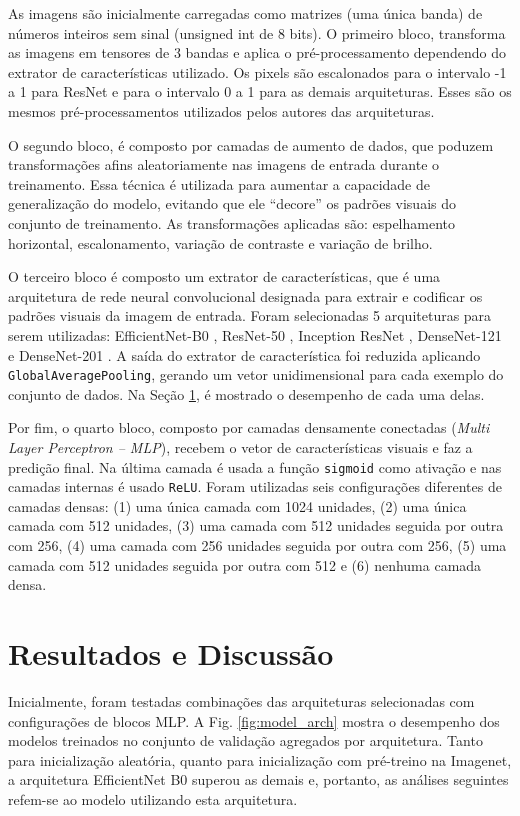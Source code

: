 \documentclass[a4,12pt]{horizon-theme}
\begin{document}
As imagens são inicialmente carregadas como matrizes (uma única banda) de números inteiros sem sinal (unsigned int de 8 bits). O primeiro bloco, transforma as imagens em tensores de 3 bandas e aplica o pré-processamento dependendo do extrator de características utilizado. Os pixels são escalonados para o intervalo -1 a 1 para ResNet e para o intervalo 0 a 1 para as demais arquiteturas. Esses são os mesmos pré-processamentos utilizados pelos autores das arquiteturas.

O segundo bloco, é composto por camadas de aumento de dados, que poduzem transformações afins aleatoriamente nas imagens de entrada durante o treinamento. Essa técnica é utilizada para aumentar a capacidade de generalização do modelo, evitando que ele ``decore'' os padrões visuais do conjunto de treinamento. As transformações aplicadas são: espelhamento horizontal, escalonamento, variação de contraste e variação de brilho.

O terceiro bloco é composto um extrator de características, que é uma arquitetura de rede neural convolucional designada para extrair e codificar os padrões visuais da imagem de entrada. Foram selecionadas 5 arquiteturas para serem utilizadas: EfficientNet-B0 \citep{EfficientNet}, ResNet-50 \citep{ResNet},  Inception ResNet \citep{InceptionResNetv2}, DenseNet-121 e DenseNet-201 \citep{DenseNet}. A saída do extrator de característica foi reduzida aplicando \texttt{GlobalAveragePooling}, gerando um vetor unidimensional para cada exemplo do conjunto de dados. Na Seção \ref{sec:resultados}, é mostrado o desempenho de cada uma delas.

Por fim, o quarto bloco, composto por camadas densamente conectadas (\emph{Multi Layer Perceptron -- MLP}), recebem o vetor de características visuais e faz a predição final. Na última camada é usada a função \texttt{sigmoid} como ativação e nas camadas internas é usado \texttt{ReLU}. Foram utilizadas seis configurações diferentes de camadas densas: (1) uma única camada com 1024 unidades, (2) uma única camada com 512 unidades, (3) uma camada com 512 unidades seguida por outra com 256, (4) uma camada com 256 unidades seguida por outra com 256, (5) uma camada com 512 unidades seguida por outra com 512 e (6) nenhuma camada densa.



\section{Resultados e Discussão}
\label{sec:resultados}
Inicialmente, foram testadas combinações das arquiteturas selecionadas com configurações de blocos MLP. A Fig. \ref{fig:model_arch} mostra o desempenho dos modelos treinados no conjunto de validação agregados por arquitetura. Tanto para inicialização aleatória, quanto para inicialização com pré-treino na Imagenet, a arquitetura EfficientNet B0 superou as demais e, portanto, as análises seguintes refem-se ao modelo utilizando esta arquitetura.
\end{document}
